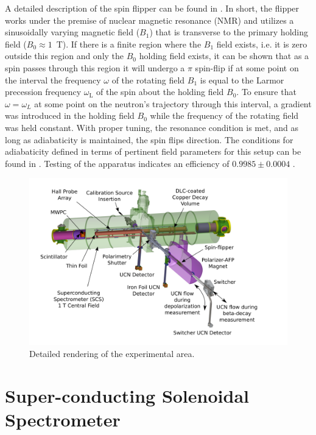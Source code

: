 A detailed description of the spin flipper can be found in \cite{holley2012high}. In short, the
flipper works under the premise of nuclear magnetic resonance (NMR) and utilizes a sinusoidally
varying magnetic field ($B_1$) that is transverse to the primary holding field ($B_0\approx 1$~T).
If there is a finite region where the $B_1$ field exists, i.e. it is zero outside this region and only
the $B_0$ holding field exists, it can be shown that as a spin passes through this region
it will undergo a $\pi$ spin-flip if at some point on the interval
the frequency $\omega$ of the rotating field $B_1$ is equal to the
Larmor precession frequency $\omega_{\mathrm{L}}$ of the spin about the holding field $B_0$.
To ensure that $\omega = \omega_L$ at some point
on the neutron's trajectory through this interval,
a gradient was introduced in the holding field $B_0$ while the frequency of
the rotating field was held constant. With proper tuning, the resonance condition is met, and as long
as adiabaticity is maintained, the spin flips direction. The conditions for adiabaticity defined in terms
of pertinent field parameters for this setup can be found in
\cite{holley2012high}. Testing of the apparatus indicates an efficiency of $0.9985\pm0.0004$ \cite{holley2012high}.

\begin{figure}[h]
  \centering
  \includegraphics[scale=0.38]{2-UCNAExperiment/UCNAFig.pdf} 
  \caption{Detailed rendering of the experimental area. }
  \label{fig:setup}
\end{figure}

\section{Super-conducting Solenoidal Spectrometer}

